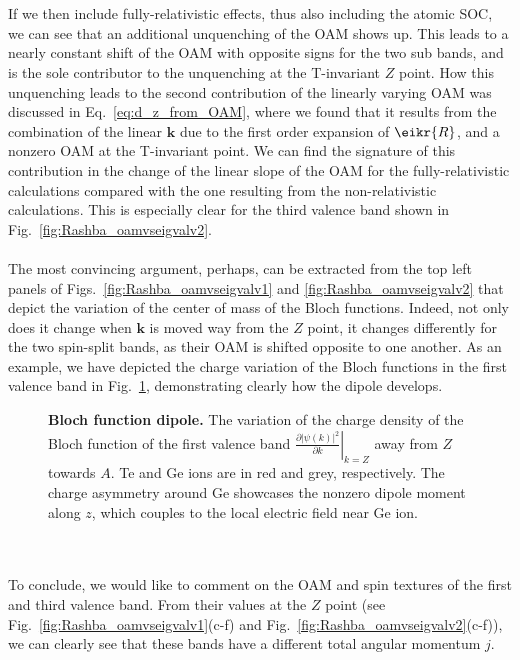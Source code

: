 \\\\
If we then include fully-relativistic effects, thus also including the atomic SOC, we can see that an additional unquenching of the OAM shows up.
This leads to a nearly constant shift of the OAM with opposite signs for the two sub bands, and is the sole contributor to the unquenching at the T-invariant $Z$ point.
How this unquenching leads to the second contribution of the linearly varying OAM was discussed in Eq.~\eqref{eq:d_z_from_OAM}, where we found that it results from the combination of the linear $\bm k$ due to the first order expansion of $\eikr{R}$, and a nonzero OAM at the T-invariant point.
We can find the signature of this contribution in the change of the linear slope of the OAM for the fully-relativistic calculations compared with the one resulting from the non-relativistic calculations.
This is especially clear for the third valence band shown in Fig.~\ref{fig:Rashba_oamvseigvalv2}.
\\\\
The most convincing argument, perhaps, can be extracted from the top left panels of Figs.~\ref{fig:Rashba_oamvseigvalv1} and \ref{fig:Rashba_oamvseigvalv2} that depict the variation of the center of mass of the Bloch functions. Indeed, not only does it change when $\bm k$ is moved way from the $Z$ point, it changes differently for the two spin-split bands, as their OAM is shifted opposite to one another.
As an example,  we have depicted the charge variation of the Bloch functions in the first valence band in Fig.~\ref{fig:Rashba_diffdens}, demonstrating clearly how the dipole develops.
\begin{figure}
	\centering
{}
\caption{\label{fig:Rashba_diffdens}{\bf Bloch function dipole.} The variation of the charge density of the Bloch function of the first valence band $\left.\frac{\partial |\psi(k)|^2}{\partial k}\right\rvert_{k=Z}$ away from $Z$ towards $A$. Te and Ge ions are in red and grey, respectively. The charge asymmetry around Ge showcases the nonzero dipole moment along $z$, which couples to the local electric field near Ge ion.}
\end{figure}
\\\\
To conclude, we would like to comment on the OAM and spin textures of the first and third valence band.
From their values at the $Z$ point (see Fig.~\ref{fig:Rashba_oamvseigvalv1}(c-f) and Fig.~\ref{fig:Rashba_oamvseigvalv2}(c-f)), we can clearly see that these bands have a different total angular momentum $j$.
